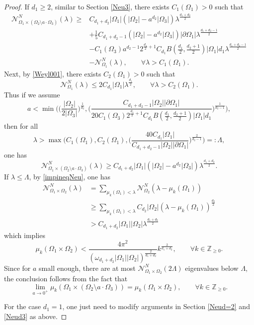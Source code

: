 \documentclass[11pt,letterpaper]{amsart}
\numberwithin{equation}{section}
\theoremstyle{plain}
\theoremstyle{plain}
\numberwithin{equation}{section}
\theoremstyle{remark}
\begin{document}
\begin{proof}
	If $d_1\ge 2$, similar to Section \ref{Neu3}, there exists $C_1(\Omega_1)>0$ such that  
	\[
	\begin{aligned}
		\mathcal N^N_{\Omega_1\times (\Omega_2\setminus a\cdot \Omega_3)}(\lambda)\ge&
		C_{d_1+d_2}|\Omega_1|(|\Omega_2|-a^{d_2}|\Omega_3|)\lambda^{\frac{d_1+d_2}{2}}\\
		&+ \frac{1}{5} C_{d_1+d_2-1} (|\Omega_2|-a^{d_2}|\Omega_3|)|\partial \Omega_1| \lambda^{\frac{d_1+d_2-1}{2}}\\
		&-C_1(\Omega_3)a^{d_2-1} 2^{\frac{d_1}{2}+1} C_{d_1} B(\frac{d_1}{2}, \frac{d_2+1}{2})|\Omega_1|d_1 \lambda^{\frac{d_1+d_2-1}{2}}\\
		&- \mathcal N^N_{\Omega_1}(\lambda),\qquad \forall \lambda>C_1(\Omega_1).
	\end{aligned} 
	\]
	Next, by \eqref{Weyl001}, there exists $C_2(\Omega_1)>0$ such that 
	\[
	\mathcal N^N_{\Omega_1}(\lambda)\le 2 C_{d_1}|\Omega_1|\lambda^{\frac{d_1}{2}},\qquad \forall \lambda>C_2(\Omega_1).
	\]
	Thus if we assume
	\[
	a<\min\bigg( \big(\frac{|\Omega_2|}{2|\Omega_3|}\big)^{\frac{1}{d_2}}, \big(\frac{C_{d_1+d_2-1}|\Omega_2||\partial \Omega_1|}{20 C_1(\Omega_3) 2^{\frac{d_1}{2}+1} C_{d_1} B(\frac{d_1}{2}, \frac{d_2+1}{2})|\Omega_1|d_1} \big)^{\frac 1 {d_2-1}} \bigg),
	\]
	then for all
	\[
	\lambda>\max\bigg( C_1(\Omega_1), C_2(\Omega_1), \big(\frac{40 C_{d_1}|\Omega_1|}{C_{d_1+d_2-1}|\Omega_2||\partial \Omega_1|}\big)^{\frac 2{d_2-1}} \bigg)=:\Lambda,
	\]
	one has
	\[
	\mathcal N^N_{\Omega_1\times (\Omega_2\setminus a\cdot \Omega_3)}(\lambda)\ge
	C_{d_1+d_2}|\Omega_1|(|\Omega_2|-a^{d_2}|\Omega_3|)\lambda^{\frac{d_1+d_2}{2}}.
	\]
	If $\lambda\le \Lambda$, by \eqref{impineqNeu}, one has
	\[
	\begin{aligned}
		\mathcal N^N_{\Omega_1\times \Omega_2}(\lambda)&=\sum_{\mu_k(\Omega_1)<\lambda} \mathcal N^N_{\Omega_2}(\lambda-\mu_k(\Omega_1))\\&\ge \sum_{\mu_k(\Omega_1)<\lambda} C_{d_2}|\Omega_2|(\lambda-\mu_k(\Omega_1))^{\frac{d_2}{2}}\\
		&>C_{d_1+d_2}|\Omega_1||\Omega_2|\lambda^{\frac{d_1+d_2}{2}}
	\end{aligned}
	\]
	which implies
	\[
	\mu_k(\Omega_1\times \Omega_2)< \frac{4\pi^2}{(\omega_{d_1+d_2} |\Omega_1||\Omega_2|)^{\frac 2{d_1+d_2}}} k^{\frac 2{d_1+d_2}},\qquad \forall k\in \mathbb Z_{\ge0}.
	\]
	Since for $a$ small enough, there are at most $\mathcal N^N_{\Omega_1\times\Omega_2}(2\Lambda)$ eigenvalues below $\Lambda$, the conclusion follows from the fact that
	\[
	\lim_{a\to 0^+}\mu_k(\Omega_1\times (\Omega_2\setminus a\cdot \Omega_3))= \mu_k(\Omega_1\times \Omega_2),\qquad \forall k\in \mathbb Z_{\ge0}.
	\]
	
	For the case $d_1=1$, one just need to  modify arguments in Section \ref{Neud=2} and \ref{Neud3} as above. 
\end{proof}
\end{document}
